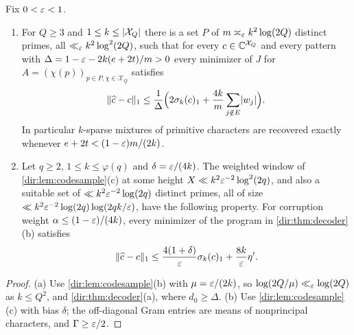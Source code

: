\begin{theorem}\label{dir:thm:primedecoder}
Fix $0<\varepsilon<1$.
\begin{enumerate}[label=\textup{(\alph*)}]
\item For $Q\ge3$ and $1\le k\le\lvert\mathcal X_Q\rvert$ there is a set $P$ of $m\asymp_\varepsilon k^2\log(2Q)$ distinct primes,
all $\ll_\varepsilon k^2\log^2(2Q)$, such that for every $c\in\mathbb{C}^{\mathcal X_Q}$ and every pattern with
$\Delta=1-\varepsilon-2k(e+2t)/m>0$ every minimizer of $J$ for $A=(\chi(p))_{p\in P,\chi\in\mathcal X_Q}$ satisfies
\[
 \lVert\widehat c-c\rVert_1\le\frac1\Delta\Bigl(2\sigma_k(c)_1+\frac{4k}m\sum_{j\notin E}\lvert w_j\rvert\Bigr).
\]
In particular $k$-sparse mixtures of primitive characters are recovered exactly whenever
$e+2t<(1-\varepsilon)m/(2k)$.
\item Let $q\ge2$, $1\le k\le\varphi(q)$ and $\delta=\varepsilon/(4k)$. The weighted window of
\cref{dir:lem:codesample}(c) at some height $X\ll k^2\varepsilon^{-2}\log^2(2q)$, and also a suitable set of
$\ll k^2\varepsilon^{-2}\log(2q)$ distinct primes, all of size $\ll k^2\varepsilon^{-2}\log(2q)\log(2qk/\varepsilon)$, have the
following property. For corruption weight $\alpha\le(1-\varepsilon)/(4k)$, every minimizer of the program in
\cref{dir:thm:decoder}(b) satisfies
\[
 \lVert\widehat c-c\rVert_1\le\frac{4(1+\delta)}{\varepsilon}\sigma_k(c)_1+\frac{8k}{\varepsilon}\eta'.
\]
\end{enumerate}
\end{theorem}

\begin{proof}
(a) Use \cref{dir:lem:codesample}(b) with $\mu=\varepsilon/(2k)$, so $\log(2Q/\mu)\ll_\varepsilon\log(2Q)$ as
$k\le Q^2$, and \cref{dir:thm:decoder}(a), where $d_0\ge\Delta$. (b) Use \cref{dir:lem:codesample}(c) with
bias $\delta$; the off-diagonal Gram entries are means of nonprincipal characters, and $\Gamma\ge\varepsilon/2$.
\end{proof}

